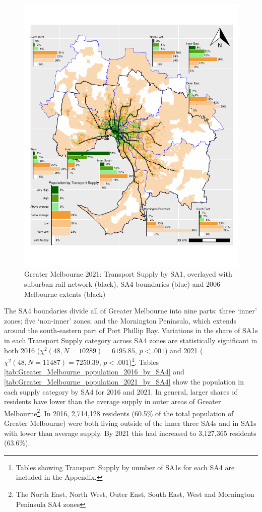 \documentclass[preprint, 3p,
authoryear]{elsarticle} %
\begin{document}
\begin{figure}
\includegraphics[width=1\linewidth]{ReynoldsCurrieQu2024_files/figure-latex/Greater_Melbourne_population_2021_by_SA4-1} \caption{Greater Melbourne 2021: Transport Supply by SA1,  overlayed with suburban rail network (black), SA4 boundaries (blue) and 2006 Melbourne extents (black)}\label{fig:Greater_Melbourne_population_2021_by_SA4}
\end{figure}

The SA4 boundaries divide all of Greater Melbourne into nine parts:
three `inner' zones; five `non-inner' zones; and the Mornington
Peninsula, which extends around the south-eastern part of Port Phillip
Bay. Variations in the share of SA1s in each Transport Supply category
across SA4 zones are statistically significant in both 2016
(\(\chi^2(48, N = 10289) = 6195.85\), \(p < .001\)) and 2021
(\(\chi^2(48, N = 11487) = 7250.39\), \(p < .001\))\footnote{Tables
  showing Transport Supply by number of SA1s for each SA4 are included
  in the Appendix.}. Tables
\ref{tab:Greater_Melbourne_population_2016_by_SA4} and
\ref{tab:Greater_Melbourne_population_2021_by_SA4} show the population
in each supply category by SA4 for 2016 and 2021. In general, larger
shares of residents have lower than the average supply in outer areas of
Greater Melbourne\footnote{The North East, North West, Outer East, South
  East, West and Mornington Peninsula SA4 zones}. In 2016, 2,714,128
residents (60.5\% of the total population of Greater Melbourne) were
both living outside of the inner three SA4s and in SA1s with lower than
average supply. By 2021 this had increased to 3,127,365 residents
(63.6\%).
\end{document}
